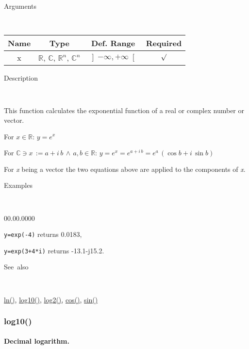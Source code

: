 \begin{description}
\item [Arguments]~
\end{description}
\begin{tabular}{|c|c|c|c|}
\hline 
Name&
Type&
Def. Range&
Required\tabularnewline
\hline
\hline 
x&
$\mathbb{R}$, $\mathbb{C}$, $\mathbb{R}^{n}$, $\mathbb{C}^{n}$&
$\left]-\infty,+\infty\right[$&
$\surd$\tabularnewline
\hline
\end{tabular}

\begin{description}
\item [Description]~
\end{description}
This function calculates the exponential function of a real or complex
number or vector.

\medskip{}
For $x\in\mathbb{R}$: $y=e^{x}$ 
\medskip{}

For $\mathbb{\mathbb{C}}\ni x\,:=a+i\, b\,\wedge\, a,b\in\mathbb{R}$:
$y=e^{x}=e^{a+i\, b}=e^{a}\,\left(\cos b+i\,\sin b\right)$
\medskip{}

\noindent For \textit{x} being a vector the two equations above are
applied to the components of \textit{x}.

\begin{description}
\item [Examples]~
\end{description}
\begin{lyxlist}{00.00.0000}
\item [\texttt{y=exp(-4)}]returns 0.0183,
\item [\texttt{y=exp(3+4{*}i)}]returns -13.1-j15.2.
\end{lyxlist}
\begin{description}
\item [See~also]~
\end{description}
\textcolor{blue}{\hyperlink{ln}{ln()}}\textcolor{black}{,} \textcolor{blue}{\hyperlink{log10}{log10()}}\textcolor{black}{,}
\textcolor{blue}{\hyperlink{log2}{log2()}}\textcolor{black}{,} \textcolor{blue}{\hyperlink{cos}{cos()}}\textcolor{black}{,}
\textcolor{blue}{\hyperlink{sin}{sin()}}


\newpage
\subsubsection*{\hypertarget{log10}{}{\Large log10()}}


\paragraph{\label{par:Decimal-logarithm}Decimal logarithm.}


